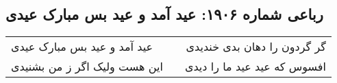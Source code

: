 \begin{center}
\section*{رباعی شماره ۱۹۰۶: عید آمد و عید بس مبارک عیدی}
\label{sec:1906}
\begin{longtable}{l p{0.5cm} r}
عید آمد و عید بس مبارک عیدی
&&
گر گردون را دهان بدی خندیدی
\\
این هست ولیک اگر ز من بشنیدی
&&
افسوس که عید عید ما را دیدی
\\
\end{longtable}
\end{center}
